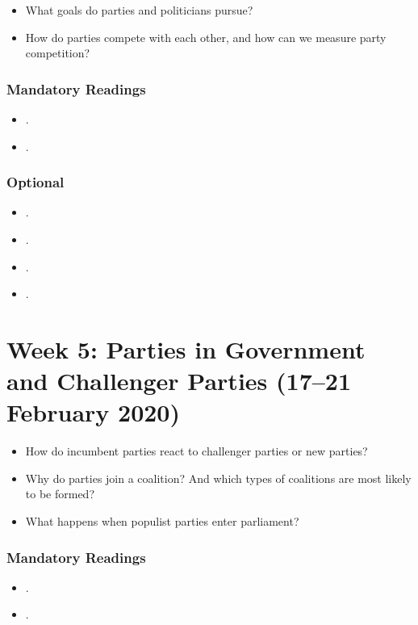 \documentclass[abstract=on,parskip=full,headings=standardclasses,fontsize=11pt,paper=a4]{scrartcl}
\begin{document}
\begin{itemize}
\renewcommand\labelitemi{--}
\item What goals do parties and politicians pursue?
\item How do parties compete with each other, and how can we measure party competition?
\end{itemize}

\subsubsection*{Mandatory Readings}
\begin{itemize}
\item {}.
\item {}.
\end{itemize}

\subsubsection*{Optional}
\begin{itemize}
\item {}.
\item {}.
\item {}.
\item {}.
\end{itemize}



\section{Week 5: Parties in Government and Challenger Parties  (17--21 February 2020)}

\begin{itemize}
\renewcommand\labelitemi{--}
\item How do incumbent parties react to challenger parties or new parties?
\item Why do parties join a coalition? And which types of coalitions are most likely to be formed?
\item What happens when populist parties enter parliament?
\end{itemize}

\subsubsection*{Mandatory Readings}
\begin{itemize}
\item {}.
\item {}.
\end{itemize}
\end{document}
